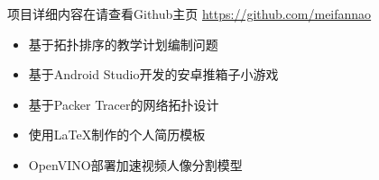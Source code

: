 \documentclass{resume}
\begin{document}
\begin{onehalfspacing}
项目详细内容在请查看Github主页 \href{https://github.com/meifannao}{https://github.com/meifannao}
\begin{itemize}
  \item 基于拓扑排序的教学计划编制问题
  \item 基于Android Studio开发的安卓推箱子小游戏
  \item 基于Packer Tracer的网络拓扑设计
  \item 使用\LaTeX 制作的个人简历模板
  \item OpenVINO部署加速视频人像分割模型
  
\end{itemize}
\end{onehalfspacing}


\end{document}
